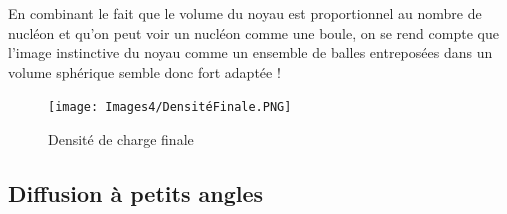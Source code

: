 \begin{itemize}[label=$\bullet$]
    En combinant le fait que le volume du noyau est proportionnel au nombre de nucléon et qu'on peut voir un nucléon comme une boule, on se rend compte que l'image instinctive du noyau comme un ensemble de balles entreposées dans un volume sphérique semble donc fort adaptée !
    \begin{figure}[H]
        \centering
        \texttt{[image: Images4/DensitéFinale.PNG]}
        \caption{Densité de charge finale}
        \label{fig : Densité de charge}
    \end{figure}
\end{itemize}


\subsection{Diffusion à petits angles}


